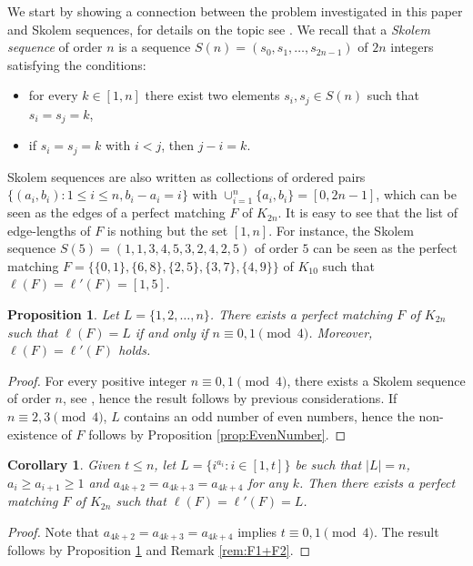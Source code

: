 \documentclass{amsart}
\newtheorem{prop}[defi]{Proposition}
\newtheorem{cor}[defi]{Corollary}
\theoremstyle{definition}
\numberwithin{equation}{section}
\begin{document}
We start by showing a connection between the problem investigated in this paper and Skolem sequences,
for details on the topic see \cite{SS}.
We recall that a \emph{Skolem sequence} of order $n$ is a sequence $S(n)=(s_0,s_1,\ldots,s_{2n-1})$ of $2n$ integers satisfying the conditions:
\begin{itemize}
\item[(1)] for every $k\in [1,n]$ there exist two elements $s_i,s_j\in S(n)$ such that $s_i=s_j=k$,
\item[(2)] if $s_i=s_j=k$ with $i<j$, then $j-i=k$.
\end{itemize}
Skolem sequences are also written as collections of ordered pairs $\{(a_i,b_i): 1\leq i \leq n, b_i-a_i=i\}$
with $\cup_{i=1}^n\{a_i,b_i\}=[0,2n-1]$, which can be seen as the edges of a perfect matching $F$ of $K_{2n}$.
It is easy to see that the list of edge-lengths of $F$ is nothing but the set  $[1, n]$.
For instance, the Skolem sequence  $S(5)=(1,1,3,4,5,3,2,4,2,5)$  of order $5$ can be seen as the perfect matching
$F=\{\{0,1\},\{6,8\},\{2,5\},\{3,7\},\{4,9\}\}$ of $K_{10}$ such that $\ell(F)=\ell'(F)=[1,5]$.



\begin{prop}\label{prop:Skolem}
Let $L=\{1,2,\ldots,n\}$. There exists a perfect matching $F$ of $K_{2n}$ such that $\ell(F)=L$
  if and only if $n\equiv 0,1\pmod 4$.
	Moreover, $\ell(F)=\ell'(F)$ holds.
\end{prop}

\begin{proof}
For every positive integer $n\equiv 0,1\pmod 4$, there exists a Skolem sequence of order $n$, see \cite{SS},
hence the result follows by previous considerations.
If $n\equiv 2,3\pmod 4$, $L$ contains an odd number of even numbers, hence the non-existence of $F$ follows by Proposition \ref{prop:EvenNumber}.
\end{proof}

\begin{cor}
Given $t\leq n$, let $L=\{i^{a_i} : i \in [1,t]\}$ be such that $|L|=n$, $a_i\geq a_{i+1}\geq 1$ and $a_{4k+2}=a_{4k+3}=a_{4k+4}$ for any $k$.
Then there exists a perfect matching $F$ of $K_{2n}$ such that $\ell(F)=\ell'(F)=L$.
\end{cor}
\begin{proof}
Note that $a_{4k+2}=a_{4k+3}=a_{4k+4}$  implies $t\equiv 0,1 \pmod 4$.
The result follows by Proposition \ref{prop:Skolem} and Remark \ref{rem:F1+F2}.
\end{proof}
\end{document}
